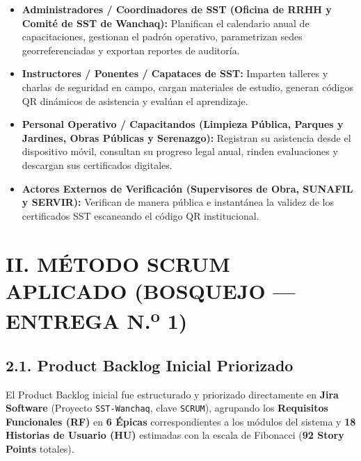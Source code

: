 \documentclass[11pt,a4paper]{article}
\begin{document}
\begin{itemize}[leftmargin=1.5em, itemsep=0.25em]
    \item \textbf{Administradores / Coordinadores de SST (Oficina de RRHH y Comité de SST de Wanchaq):} Planifican el calendario anual de capacitaciones, gestionan el padrón operativo, parametrizan sedes georreferenciadas y exportan reportes de auditoría.
    \item \textbf{Instructores / Ponentes / Capataces de SST:} Imparten talleres y charlas de seguridad en campo, cargan materiales de estudio, generan códigos QR dinámicos de asistencia y evalúan el aprendizaje.
    \item \textbf{Personal Operativo / Capacitandos (Limpieza Pública, Parques y Jardines, Obras Públicas y Serenazgo):} Registran su asistencia desde el dispositivo móvil, consultan su progreso legal anual, rinden evaluaciones y descargan sus certificados digitales.
    \item \textbf{Actores Externos de Verificación (Supervisores de Obra, SUNAFIL y SERVIR):} Verifican de manera pública e instantánea la validez de los certificados SST escaneando el código QR institucional.
\end{itemize}

\newpage

\section*{II. MÉTODO SCRUM APLICADO (BOSQUEJO --- ENTREGA N.\textsuperscript{o} 1)}

\subsection*{2.1. Product Backlog Inicial Priorizado}

El Product Backlog inicial fue estructurado y priorizado directamente en \textbf{Jira Software} (Proyecto \texttt{SST-Wanchaq}, clave \texttt{SCRUM}), agrupando los \textbf{Requisitos Funcionales (RF)} en \textbf{6 Épicas} correspondientes a los módulos del sistema y \textbf{18 Historias de Usuario (HU)} estimadas con la escala de Fibonacci (\textbf{92 Story Points} totales).
\end{document}
